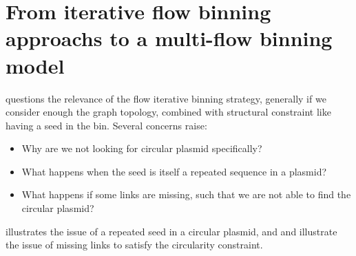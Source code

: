 \section{From iterative flow binning approachs to a multi-flow binning model}\label{sec:plasmid_structures}

 questions the relevance of the flow iterative binning strategy, generally if we consider enough the graph topology, combined with structural constraint like having a seed in the bin.
Several concerns raise:

\begin{itemize}
  \item Why are we not looking for circular plasmid specifically?
  \item What happens when the seed is itself a repeated sequence in a plasmid?
  \item What happens if some links are missing, such that we are not able to find the circular plasmid?
\end{itemize}

 illustrates the issue of a repeated seed in a circular plasmid, and  and  illustrate the issue of missing links to satisfy the circularity constraint.

